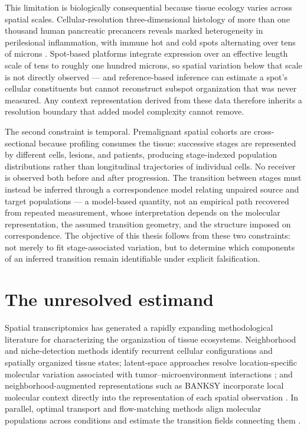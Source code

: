 This limitation is biologically consequential because tissue ecology varies
across spatial scales. Cellular-resolution three-dimensional histology of more
than one thousand human pancreatic precancers reveals marked heterogeneity in
perilesional inflammation, with immune hot and cold spots alternating over
tens of microns \autocite{Kiemen2026-dz}. Spot-based platforms integrate
expression over an effective length scale of tens to roughly one hundred
microns, so spatial variation below that scale is not directly observed ---
and reference-based inference can estimate a spot's cellular constituents but
cannot reconstruct subspot organization that was never measured. Any context
representation derived from these data therefore inherits a resolution
boundary that added model complexity cannot remove.

The second constraint is temporal. Premalignant spatial cohorts are
cross-sectional because profiling consumes the tissue: successive stages are
represented by different cells, lesions, and patients, producing
stage-indexed population distributions rather than longitudinal trajectories
of individual cells. No receiver is observed both before and after
progression. The transition between stages must instead be inferred through a
correspondence model relating unpaired source and target populations
\autocite{Bunne2024-pl,Weinreb2018-jq} --- a model-based quantity, not an
empirical path recovered from repeated measurement, whose interpretation
depends on the molecular representation, the assumed transition geometry, and
the structure imposed on correspondence. The objective of this thesis follows
from these two constraints: not merely to fit stage-associated variation, but
to determine which components of an inferred transition remain identifiable
under explicit falsification.

\section{The unresolved estimand}
\label{sec:intro-gap}

Spatial transcriptomics has generated a rapidly expanding methodological
literature for characterizing the organization of tissue ecosystems.
Neighborhood and niche-detection methods identify recurrent cellular
configurations and spatially organized tissue states; latent-space approaches
resolve location-specific molecular variation associated with
tumor--microenvironment interactions \autocite{Deshpande2023-zw}; and
neighborhood-augmented representations such as BANKSY incorporate local
molecular context directly into the representation of each spatial
observation \autocite{Singhal2024-rv}. In parallel, optimal transport and
flow-matching methods align molecular populations across conditions and
estimate the transition fields connecting them
\autocite{Cuturi2013-li,Schiebinger2019-lm,Lipman2022-ns,Klein2025-sr,Richter2026-ib}.

